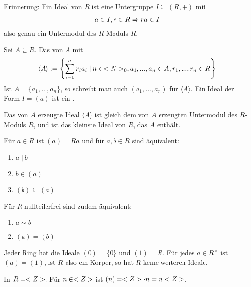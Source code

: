 \begin{remark}
	Erinnerung: Ein Ideal von $R$ ist eine Untergruppe $I\subseteq (R,+)$ mit 
	\begin{align}
		a\in I,r\in R\Rightarrow ra\in I\notag
	\end{align}
	also genau ein Untermodul des $R$-Moduls $R$.
\end{remark}

\begin{definition}
	Sei $A\subseteq R$. Das von $A$  mit
	\begin{align}
		\langle A\rangle :=\left\lbrace \sum_{i=1}^n r_ia_i\mid n\in <N>_0,a_1,...,a_n\in A,r_1,...,r_n\in R\right\rbrace \notag
	\end{align}
	Ist $A=\{a_1,...,a_n\}$, so schreibt man auch $(a_1,...,a_n)$ für $\langle A\rangle$. Ein Ideal der Form $I=(a)$ ist ein .
\end{definition}

\begin{remark}
	Das von $A$ erzeugte Ideal $\langle A\rangle$ ist gleich dem von $A$ erzeugten Untermodul des $R$-Moduls $R$, und ist das kleinste Ideal von $R$, das $A$ enthält.
\end{remark}

\begin{remark}
	Für $a\in R$ ist $(a)=Ra$ und für $a,b\in R$ sind äquivalent:
	\begin{enumerate}
		\item $a\mid b$
		\item $b\in (a)$
		\item $(b)\subseteq (a)$
	\end{enumerate}
	Für $R$ nullteilerfrei sind zudem äquivalent:
	\begin{enumerate}
		\item $a\sim b$
		\item $(a)=(b)$
	\end{enumerate}
\end{remark}

\begin{example}
	Jeder Ring hat die Ideale $(0)=\{0\}$ und $(1)=R$. Für jedes $a\in R^\times$ ist $(a)=(1)$, ist $R$ also ein Körper, so hat $R$ keine weiteren Ideale.
\end{example}

\begin{example}
	In $R=<Z>$: Für $n\in<Z>$ ist $(n)=<Z>\cdot n=n<Z>$.
\end{example}
